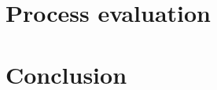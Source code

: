 \documentclass[10pt]{scrreprt}
\begin{document}
\chapter{Process evaluation}



\chapter{Conclusion}




\nocite{*}
\end{document}
